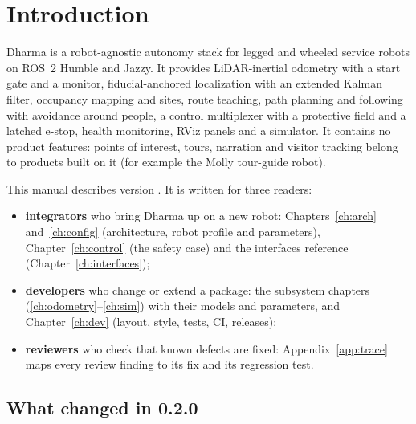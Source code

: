 \chapter{Introduction}
\label{ch:intro}

Dharma is a robot-agnostic autonomy stack for legged and wheeled service robots on ROS~2
Humble and Jazzy. It provides LiDAR-inertial odometry with a start gate and a monitor,
fiducial-anchored localization with an extended Kalman filter, occupancy mapping and sites,
route teaching, path planning and following with avoidance around people, a control
multiplexer with a protective field and a latched e-stop, health monitoring, RViz panels and a
simulator. It contains no product features: points of interest, tours, narration and visitor
tracking belong to products built on it (for example the Molly tour-guide robot).

This manual describes version \DharmaVersion. It is written for three readers:
\begin{itemize}
  \item \textbf{integrators} who bring Dharma up on a new robot: Chapters~\ref{ch:arch}
    and~\ref{ch:config} (architecture, robot profile and parameters), Chapter~\ref{ch:control}
    (the safety case) and the interfaces reference (Chapter~\ref{ch:interfaces});
  \item \textbf{developers} who change or extend a package: the subsystem chapters
    (\ref{ch:odometry}--\ref{ch:sim}) with their models and parameters, and
    Chapter~\ref{ch:dev} (layout, style, tests, CI, releases);
  \item \textbf{reviewers} who check that known defects are fixed: Appendix~\ref{app:trace}
    maps every review finding to its fix and its regression test.
\end{itemize}

\section{What changed in 0.2.0}

